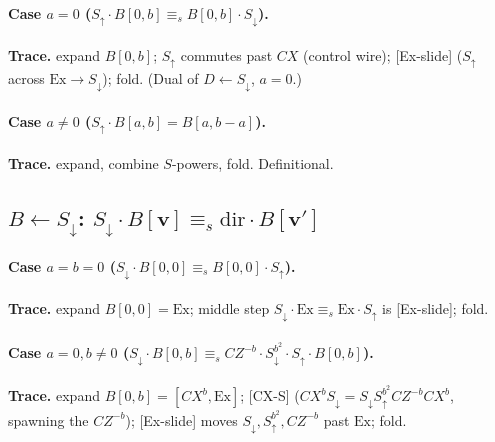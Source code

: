 \documentclass[a4paper]{article}
\newcommand{\lem}[1]{\textsf{[#1]}}      %
\begin{document}
\paragraph{Case $a=0$ \;($S_\uparrow\cdot B[0,b]\equiv_s B[0,b]\cdot S_\downarrow$).}
\begin{center}\end{center}
\textbf{Trace.} expand $B[0,b]$; $S_\uparrow$ commutes past $CX$ (control wire); \lem{Ex-slide} ($S_\uparrow$ across $\mathrm{Ex}\to S_\downarrow$); fold. (Dual of $D\leftarrow S_\downarrow$, $a=0$.)

\paragraph{Case $a\neq0$ \;($S_\uparrow\cdot B[a,b]=B[a,b-a]$).}
\begin{center}\end{center}
\textbf{Trace.} expand, combine $S$-powers, fold. Definitional.

\subsection{$B\leftarrow S_\downarrow$: \; $S_\downarrow\cdot B[\mathbf v]\equiv_s \mathrm{dir}\cdot B[\mathbf v']$}
\paragraph{Case $a=b=0$ \;($S_\downarrow\cdot B[0,0]\equiv_s B[0,0]\cdot S_\uparrow$).}\label{sub:sb00}
\begin{center}\end{center}
\textbf{Trace.} expand $B[0,0]=\mathrm{Ex}$; middle step $S_\downarrow\cdot\mathrm{Ex}\equiv_s\mathrm{Ex}\cdot S_\uparrow$ is \lem{Ex-slide}; fold.

\paragraph{Case $a=0,b\neq0$ \;($S_\downarrow\cdot B[0,b]\equiv_s CZ^{-b}\cdot S^{b^2}_\downarrow\cdot S_\uparrow\cdot B[0,b]$).}
\label{sub:sb0b}\begin{center}\end{center}
\textbf{Trace.} expand $B[0,b]=[CX^b,\mathrm{Ex}]$; \lem{CX-S} ($CX^b S_\downarrow=S_\downarrow S^{b^2}_\uparrow CZ^{-b} CX^b$, spawning the $CZ^{-b}$); \lem{Ex-slide} moves $S_\downarrow,S^{b^2}_\uparrow,CZ^{-b}$ past $\mathrm{Ex}$; fold.
\end{document}
